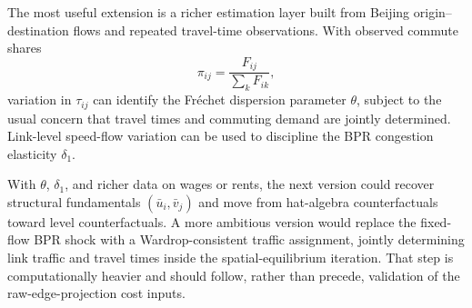 \documentclass[12pt, a4paper]{article}
\begin{document}
The most useful extension is a richer estimation layer built from Beijing
origin--destination flows and repeated travel-time observations.  With
observed commute shares
\begin{equation}
  \pi_{ij} = \frac{F_{ij}}{\sum_k F_{ik}},
\end{equation}
variation in $\tau_{ij}$ can identify the Fr\'echet dispersion parameter
$\theta$, subject to the usual concern that travel times and commuting demand
are jointly determined.  Link-level speed-flow variation can be used to
discipline the BPR congestion elasticity $\delta_1$.

With $\theta$, $\delta_1$, and richer data on wages or rents, the next version
could recover structural fundamentals $(\bar{u}_i,\bar{v}_j)$ and move from
hat-algebra counterfactuals toward level counterfactuals.  A more ambitious
version would replace the fixed-flow BPR shock with a Wardrop-consistent
traffic assignment, jointly determining link traffic and travel times inside
the spatial-equilibrium iteration.  That step is computationally heavier and
should follow, rather than precede, validation of the raw-edge-projection cost
inputs.
\end{document}
